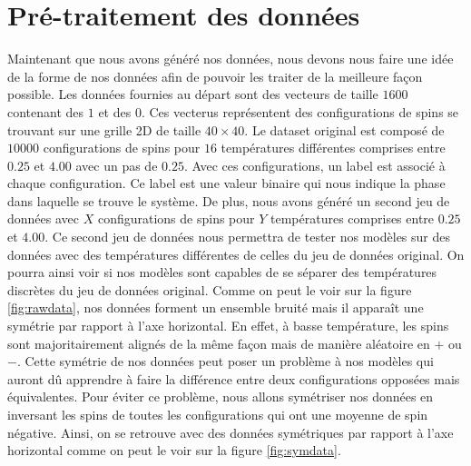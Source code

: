 \documentclass[11pt, parskip=half]{scrartcl} %
\begin{document}
\section{Pré-traitement des données}
Maintenant que nous avons généré nos données, nous devons nous faire une idée de la forme de nos données afin de pouvoir les traiter de la meilleure façon possible.
Les données fournies au départ sont des vecteurs de taille $1600$ contenant des $1$ et des $0$. Ces vecterus représentent des configurations de spins se trouvant sur une grille 2D de taille $40 \times 40$. Le dataset original est composé de $10000$ configurations de spins pour $16$ températures différentes comprises entre $0.25$ et $4.00$ avec un pas de $0.25$.
Avec ces configurations, un label est associé à chaque configuration. Ce label est une valeur binaire qui nous indique la phase dans laquelle se trouve le système.
De plus, nous avons généré un second jeu de données avec $X$ configurations de spins pour $Y$ températures comprises entre $0.25$ et $4.00$. Ce second jeu de données nous permettra de tester nos modèles sur des données avec des températures différentes de celles du jeu de données original. On pourra ainsi voir si nos modèles sont capables de se séparer des températures discrètes du jeu de données original.
Comme on peut le voir sur la figure \ref{fig:rawdata}, nos données forment un ensemble bruité mais il apparaît une symétrie par rapport à l'axe horizontal. En effet, à basse température, les spins sont majoritairement alignés de la même façon mais de manière aléatoire en $+$ ou $-$.
Cette symétrie de nos données peut poser un problème à nos modèles qui auront dû apprendre à faire la différence entre deux configurations opposées mais équivalentes. Pour éviter ce problème, nous allons symétriser nos données en inversant les spins de toutes les configurations qui ont une moyenne de spin négative.
Ainsi, on se retrouve avec des données symétriques par rapport à l'axe horizontal comme on peut le voir sur la figure \ref{fig:symdata}.
\end{document}
